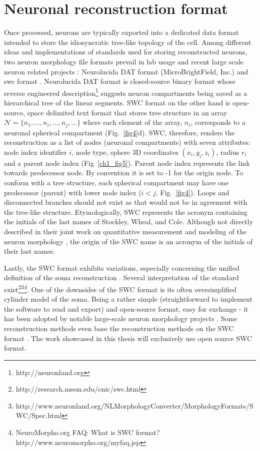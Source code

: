 \section{Neuronal reconstruction format}
\label{sec:format}
Once processed, neurons are typically exported into a dedicated data format intended to store the idiosyncratic tree-like topology of the cell. Among different ideas and implementations of standards used for storing reconstructed neurons, two neuron morphology file formats prevail in lab usage and recent large scale neuron related projects \cite{bakker2016web}: Neurolucida DAT format (MicroBrightField, Inc.) and \gls{swc} format \cite{cannon1998line}. Neurolucida DAT format is closed-source binary format whose reverse engineered description\footnote{http://neuronland.org} suggests neuron compartments being saved as a hierarchical tree of the linear segments. SWC format on the other hand is open-source, space delimited text format that stores tree structure in an array $\mathcal{N} = \{ n_1, \dots , n_i, \dots , n_j, \dots  \}$ where each element of the array, $n_i$, corresponds to a neuronal spherical compartment (Fig.~\ref{fig4}d). SWC, therefore, renders the reconstruction as a list of nodes (neuronal compartments) with seven attributes: node index identifier $i$, node type, sphere 3D coordinates $(x_i,y_i,z_i)$, radius $r_i$ and a parent node index (Fig~\ref{ch1_fig5}). Parent node index represents the link towards predecessor node. By convention it is set to -1 for the origin node. To conform with a tree structure, each spherical compartment may have one predecessor (parent) with lower node index ($i<j$, Fig.~\ref{fig4}). Loops and disconnected branches should not exist as that would not be in agreement with the tree-like structure. Etymologically, SWC represents the acronym containing the initials of the last names of Stockley, Wheal, and Cole. Although not directly described in their joint work on quantitative measurement and modeling of the neuron morphology \cite{stockley1993system}, the origin of the SWC name is an acronym of the initials of their last names. 

Lastly, the SWC format exhibits variations, especially concerning the unified definition of the soma reconstruction \cite{bakker2016web}. Several interpretation of the standard exist\footnote{http://research.mssm.edu/cnic/swc.html}\footnote{http://www.neuronland.org/NLMorphologyConverter/MorphologyFormats/SWC/Spec.html}\footnote{NeuroMorpho.org FAQ: What is SWC format? http://www.neuromorpho.org/myfaq.jsp}. One of the downsides of the SWC format is its often oversimplified cylinder model of the soma. Being a rather simple (straightforward to implement the software to read and export) and open-source format, easy for exchange - it has been adopted by notable large-scale neuron morphology projects \cite{ascoli2007neuromorpho,peng2015bigneuron}. Some reconstruction methods even base the reconstruction methods on the SWC format \cite{feng2015neutube}. The work showcased in this thesis will exclusively use open source SWC format.
 
